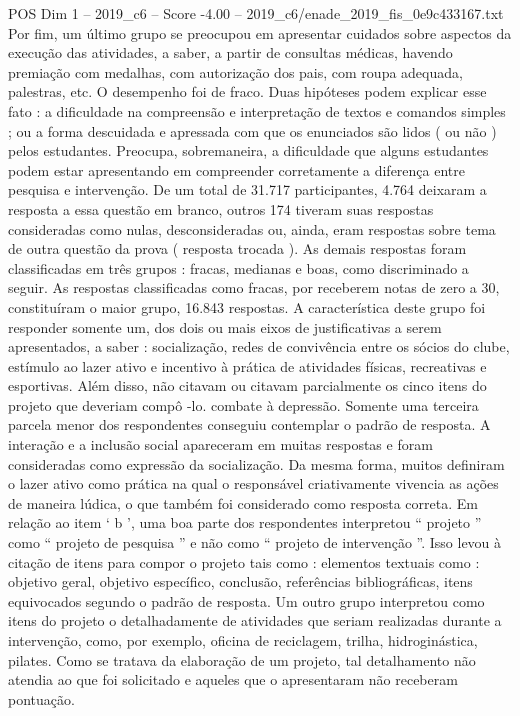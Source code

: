 \begin{textsample}{POS Dim 1 – 2019\_c6 – Score -4.00 – 2019\_c6/enade\_2019\_fis\_0e9c433167.txt}
Por fim, um último grupo se preocupou em apresentar cuidados sobre aspectos da execução das atividades, a saber, a partir de consultas médicas, havendo premiação com medalhas, com autorização dos pais, com roupa adequada, palestras, etc.
O desempenho foi de fraco.
Duas hipóteses podem explicar esse fato : a dificuldade na compreensão e interpretação de textos e comandos simples ; ou a forma descuidada e apressada com que os enunciados são lidos ( ou não ) pelos estudantes.
Preocupa, sobremaneira, a dificuldade que alguns estudantes podem estar apresentando em compreender corretamente a diferença entre pesquisa e intervenção.
De um total de 31.717 participantes, 4.764 deixaram a resposta a essa questão em branco, outros 174 tiveram suas respostas consideradas como nulas, desconsideradas ou, ainda, eram respostas sobre tema de outra questão da prova ( resposta trocada ).
As demais respostas foram classificadas em três grupos : fracas, medianas e boas, como discriminado a seguir.
As respostas classificadas como fracas, por receberem notas de zero a 30, constituíram o maior grupo, 16.843 respostas.
A característica deste grupo foi responder somente um, dos dois ou mais eixos de justificativas a serem apresentados, a saber : socialização, redes de convivência entre os sócios do clube, estímulo ao lazer ativo e incentivo à prática de atividades físicas, recreativas e esportivas.
Além disso, não citavam ou citavam parcialmente os cinco itens do projeto que deveriam compô -lo. combate à depressão.
Somente uma terceira parcela menor dos respondentes conseguiu contemplar o padrão de resposta.
A interação e a inclusão social apareceram em muitas respostas e foram consideradas como expressão da socialização.
Da mesma forma, muitos definiram o lazer ativo como prática na qual o responsável criativamente vivencia as ações de maneira lúdica, o que também foi considerado como resposta correta.
Em relação ao item ‘ b ’, uma boa parte dos respondentes interpretou “ projeto ” como “ projeto de pesquisa ” e não como “ projeto de intervenção ”.
Isso levou à citação de itens para compor o projeto tais como : elementos textuais como : objetivo geral, objetivo específico, conclusão, referências bibliográficas, itens equivocados segundo o padrão de resposta.
Um outro grupo interpretou como itens do projeto o detalhadamente de atividades que seriam realizadas durante a intervenção, como, por exemplo, oficina de reciclagem, trilha, hidroginástica, pilates.
Como se tratava da elaboração de um projeto, tal detalhamento não atendia ao que foi solicitado e aqueles que o apresentaram não receberam pontuação.

\end{textsample}
